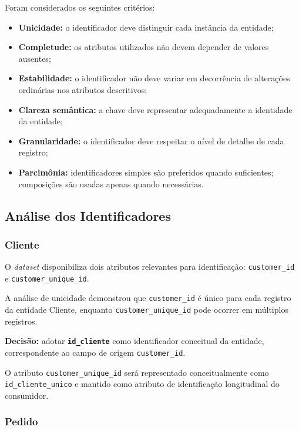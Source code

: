 \documentclass[12pt,a4paper]{article}
\begin{document}
	Foram considerados os seguintes critérios:
	
	\begin{itemize}[leftmargin=1.2cm]
		\item \textbf{Unicidade:} o identificador deve distinguir cada instância da entidade;
		\item \textbf{Completude:} os atributos utilizados não devem depender de valores ausentes;
		\item \textbf{Estabilidade:} o identificador não deve variar em decorrência de alterações ordinárias nos atributos descritivos;
		\item \textbf{Clareza semântica:} a chave deve representar adequadamente a identidade da entidade;
		\item \textbf{Granularidade:} o identificador deve respeitar o nível de detalhe de cada registro;
		\item \textbf{Parcimônia:} identificadores simples são preferidos quando
		suficientes; composições são usadas apenas quando necessárias.
	\end{itemize}
	
	\subsection{Análise dos Identificadores}
	
	\subsubsection{Cliente}
	
	O \textit{dataset} disponibiliza dois atributos relevantes para identificação:
	\texttt{customer\_id} e \texttt{customer\_unique\_id}.
	
	A análise de unicidade demonstrou que \texttt{customer\_id} é único para cada
	registro da entidade Cliente, enquanto \texttt{customer\_unique\_id} pode
	ocorrer em múltiplos registros.
	
	\noindent
	\textbf{Decisão:}
	adotar \textbf{\texttt{id\_cliente}} como identificador conceitual da entidade,
	correspondente ao campo de origem \texttt{customer\_id}.
	
	O atributo \nolinkurl{customer_unique_id} será representado conceitualmente
	como \nolinkurl{id_cliente_unico} e mantido como atributo de identificação
	longitudinal do consumidor.
	
	\subsubsection{Pedido}
	
\end{document}
